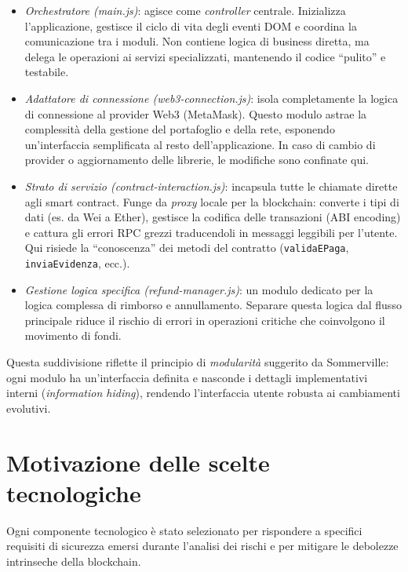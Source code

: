 \begin{itemize}
    \item \textit{Orchestratore (main.js)}: agisce come \textit{controller} centrale. Inizializza l'applicazione, gestisce il ciclo di vita degli eventi DOM e coordina la comunicazione tra i moduli. Non contiene logica di business diretta, ma delega le operazioni ai servizi specializzati, mantenendo il codice ``pulito'' e testabile.
    
    \item \textit{Adattatore di connessione (web3-connection.js)}: isola completamente la logica di connessione al provider Web3 (MetaMask). Questo modulo astrae la complessità della gestione del portafoglio e della rete, esponendo un'interfaccia semplificata al resto dell'applicazione. In caso di cambio di provider o aggiornamento delle librerie, le modifiche sono confinate qui.
    
    \item \textit{Strato di servizio (contract-interaction.js)}: incapsula tutte le chiamate dirette agli smart contract. Funge da \textit{proxy} locale per la blockchain: converte i tipi di dati (es. da Wei a Ether), gestisce la codifica delle transazioni (ABI encoding) e cattura gli errori RPC grezzi traducendoli in messaggi leggibili per l'utente. Qui risiede la ``conoscenza'' dei metodi del contratto (\texttt{validaEPaga}, \texttt{inviaEvidenza}, ecc.).
    
    \item \textit{Gestione logica specifica (refund-manager.js)}: un modulo dedicato per la logica complessa di rimborso e annullamento. Separare questa logica dal flusso principale riduce il rischio di errori in operazioni critiche che coinvolgono il movimento di fondi.
\end{itemize}

Questa suddivisione riflette il principio di \textit{modularità} suggerito da Sommerville: ogni modulo ha un'interfaccia definita e nasconde i dettagli implementativi interni (\textit{information hiding}), rendendo l'interfaccia utente robusta ai cambiamenti evolutivi.

\section{Motivazione delle scelte tecnologiche}

Ogni componente tecnologico è stato selezionato per rispondere a specifici requisiti di sicurezza emersi durante l'analisi dei rischi e per mitigare le debolezze intrinseche della blockchain.

